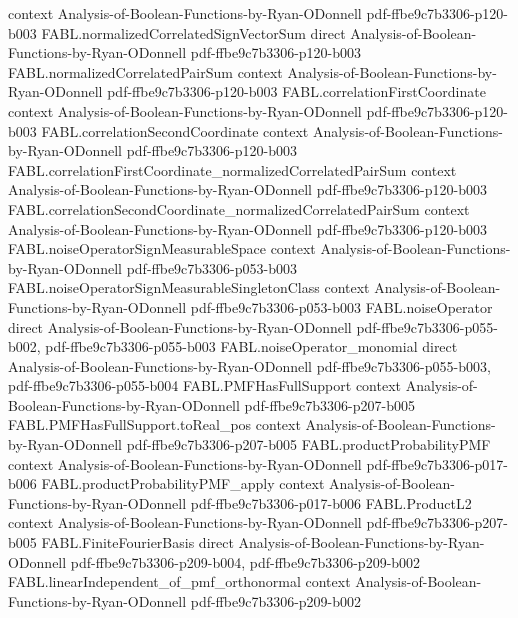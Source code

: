 \begin{theorem}
  {context}
  {Analysis-of-Boolean-Functions-by-Ryan-ODonnell}
  {pdf-ffbe9c7b3306-p120-b003}
\proofstep
  {FABL.normalizedCorrelatedSignVectorSum}
  {direct}
  {Analysis-of-Boolean-Functions-by-Ryan-ODonnell}
  {pdf-ffbe9c7b3306-p120-b003}
\proofstep
  {FABL.normalizedCorrelatedPairSum}
  {context}
  {Analysis-of-Boolean-Functions-by-Ryan-ODonnell}
  {pdf-ffbe9c7b3306-p120-b003}
\proofstep
  {FABL.correlationFirstCoordinate}
  {context}
  {Analysis-of-Boolean-Functions-by-Ryan-ODonnell}
  {pdf-ffbe9c7b3306-p120-b003}
\proofstep
  {FABL.correlationSecondCoordinate}
  {context}
  {Analysis-of-Boolean-Functions-by-Ryan-ODonnell}
  {pdf-ffbe9c7b3306-p120-b003}
\proofstep
  {FABL.correlationFirstCoordinate_normalizedCorrelatedPairSum}
  {context}
  {Analysis-of-Boolean-Functions-by-Ryan-ODonnell}
  {pdf-ffbe9c7b3306-p120-b003}
\proofstep
  {FABL.correlationSecondCoordinate_normalizedCorrelatedPairSum}
  {context}
  {Analysis-of-Boolean-Functions-by-Ryan-ODonnell}
  {pdf-ffbe9c7b3306-p120-b003}
\proofstep
  {FABL.noiseOperatorSignMeasurableSpace}
  {context}
  {Analysis-of-Boolean-Functions-by-Ryan-ODonnell}
  {pdf-ffbe9c7b3306-p053-b003}
\proofstep
  {FABL.noiseOperatorSignMeasurableSingletonClass}
  {context}
  {Analysis-of-Boolean-Functions-by-Ryan-ODonnell}
  {pdf-ffbe9c7b3306-p053-b003}
\proofstep
  {FABL.noiseOperator}
  {direct}
  {Analysis-of-Boolean-Functions-by-Ryan-ODonnell}
  {pdf-ffbe9c7b3306-p055-b002,
    pdf-ffbe9c7b3306-p055-b003}
\proofstep
  {FABL.noiseOperator_monomial}
  {direct}
  {Analysis-of-Boolean-Functions-by-Ryan-ODonnell}
  {pdf-ffbe9c7b3306-p055-b003,
    pdf-ffbe9c7b3306-p055-b004}
\proofstep
  {FABL.PMFHasFullSupport}
  {context}
  {Analysis-of-Boolean-Functions-by-Ryan-ODonnell}
  {pdf-ffbe9c7b3306-p207-b005}
\proofstep
  {FABL.PMFHasFullSupport.toReal_pos}
  {context}
  {Analysis-of-Boolean-Functions-by-Ryan-ODonnell}
  {pdf-ffbe9c7b3306-p207-b005}
\proofstep
  {FABL.productProbabilityPMF}
  {context}
  {Analysis-of-Boolean-Functions-by-Ryan-ODonnell}
  {pdf-ffbe9c7b3306-p017-b006}
\proofstep
  {FABL.productProbabilityPMF_apply}
  {context}
  {Analysis-of-Boolean-Functions-by-Ryan-ODonnell}
  {pdf-ffbe9c7b3306-p017-b006}
\proofstep
  {FABL.ProductL2}
  {context}
  {Analysis-of-Boolean-Functions-by-Ryan-ODonnell}
  {pdf-ffbe9c7b3306-p207-b005}
\proofstep
  {FABL.FiniteFourierBasis}
  {direct}
  {Analysis-of-Boolean-Functions-by-Ryan-ODonnell}
  {pdf-ffbe9c7b3306-p209-b004,
    pdf-ffbe9c7b3306-p209-b002}
\proofstep
  {FABL.linearIndependent_of_pmf_orthonormal}
  {context}
  {Analysis-of-Boolean-Functions-by-Ryan-ODonnell}
  {pdf-ffbe9c7b3306-p209-b002}

\end{theorem}
